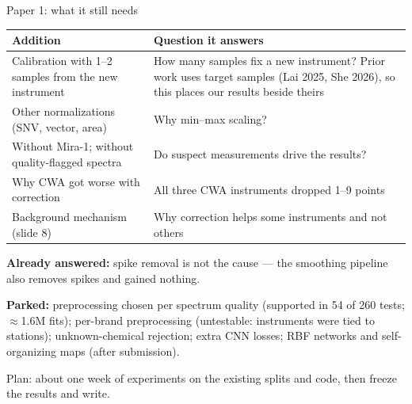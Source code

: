 \documentclass[aspectratio=169,10pt]{beamer}
\newcommand{\takeaway}[1]{%
  \par\vspace{2pt}\noindent\colorbox{cTake}{\parbox{\dimexpr\textwidth-2\fboxsep\relax}{\small #1}}}
\begin{document}
\begin{frame}{Paper 1: what it still needs}
\footnotesize
\renewcommand{\arraystretch}{1.1}
\begin{tabular}{@{}>{\raggedright\arraybackslash}p{}>{\raggedright\arraybackslash}p{}@{}}
\toprule
Addition & Question it answers\\
\midrule
Calibration with 1--2 samples from the new instrument & How many samples fix a new instrument? Prior work uses target samples (Lai 2025, She 2026), so this places our results beside theirs\\
Other normalizations (SNV, vector, area) & Why min--max scaling?\\
Without Mira-1; without quality-flagged spectra & Do suspect measurements drive the results?\\
Why CWA got worse with correction & All three CWA instruments dropped 1--9 points\\
Background mechanism (slide 8) & Why correction helps some instruments and not others\\
\bottomrule
\end{tabular}

\medskip
\textbf{Already answered:} spike removal is not the cause --- the smoothing pipeline also removes spikes and gained nothing.

\smallskip
\textbf{Parked:} preprocessing chosen per spectrum quality (supported in 54 of 260 tests; $\approx$1.6M fits); per-brand preprocessing (untestable: instruments were tied to stations); unknown-chemical rejection; extra CNN losses; RBF networks and self-organizing maps (after submission).
\takeaway{Plan: about one week of experiments on the existing splits and code, then freeze the results and write.}
\end{frame}
\end{document}
